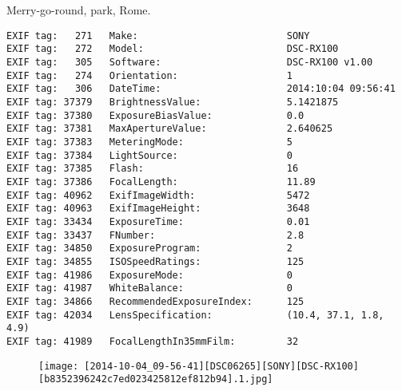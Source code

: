 \section{\protect{}}
\noindent Merry-go-round, park, Rome.
\noindent
\begin{lstlisting}
EXIF tag:   271   Make:                          SONY
EXIF tag:   272   Model:                         DSC-RX100
EXIF tag:   305   Software:                      DSC-RX100 v1.00
EXIF tag:   274   Orientation:                   1
EXIF tag:   306   DateTime:                      2014:10:04 09:56:41
EXIF tag: 37379   BrightnessValue:               5.1421875
EXIF tag: 37380   ExposureBiasValue:             0.0
EXIF tag: 37381   MaxApertureValue:              2.640625
EXIF tag: 37383   MeteringMode:                  5
EXIF tag: 37384   LightSource:                   0
EXIF tag: 37385   Flash:                         16
EXIF tag: 37386   FocalLength:                   11.89
EXIF tag: 40962   ExifImageWidth:                5472
EXIF tag: 40963   ExifImageHeight:               3648
EXIF tag: 33434   ExposureTime:                  0.01
EXIF tag: 33437   FNumber:                       2.8
EXIF tag: 34850   ExposureProgram:               2
EXIF tag: 34855   ISOSpeedRatings:               125
EXIF tag: 41986   ExposureMode:                  0
EXIF tag: 41987   WhiteBalance:                  0
EXIF tag: 34866   RecommendedExposureIndex:      125
EXIF tag: 42034   LensSpecification:             (10.4, 37.1, 1.8, 4.9)
EXIF tag: 41989   FocalLengthIn35mmFilm:         32

\end{lstlisting}
\clearpage
\begin{figure}
\raggedleft
\texttt{[image: [2014-10-04\_09-56-41][DSC06265][SONY][DSC-RX100][b8352396242c7ed023425812ef812b94].1.jpg]}
\end{figure}


\clearpage
